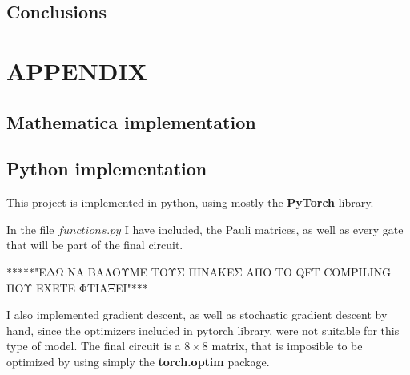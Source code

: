 \documentclass[inscr,ack,preface]{diphdthesis}
\begin{document}
\section{Conclusions}


\chapter{APPENDIX}
\section{Mathematica implementation}
\section{Python implementation}

This project is implemented in python, using mostly the \textbf{PyTorch} library. 

In the file $functions.py$ I have included, the Pauli matrices, as well as every gate that will be part of the final circuit. 


*****"ΕΔΩ ΝΑ ΒΑΛΟΥΜΕ ΤΟΥΣ ΠΙΝΑΚΕΣ ΑΠΟ ΤΟ QFT COMPILING ΠΟΥ ΕΧΕΤΕ ΦΤΙΑΞΕΙ"***

I also implemented gradient descent, as well as stochastic gradient descent by hand, since the optimizers included in pytorch library, were not suitable for this type of model. The final circuit is a $8\times8$ matrix, that is imposible to be optimized by using simply the \textbf{torch.optim} package.




\end{document}
